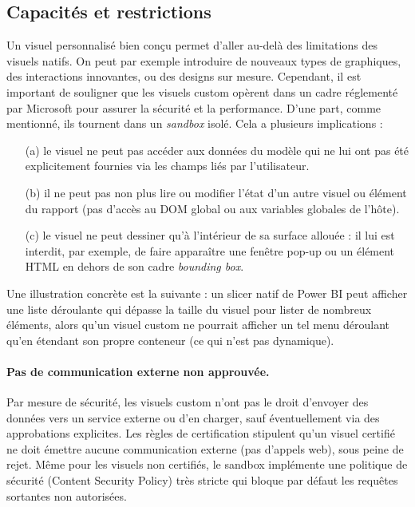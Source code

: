 \subsection*{Capacités et restrictions}
Un visuel personnalisé bien conçu permet d’aller au-delà des limitations des visuels natifs. On peut par exemple introduire de nouveaux types de graphiques, des interactions innovantes, ou des designs sur mesure. Cependant, il est important de souligner que les visuels custom opèrent dans un cadre réglementé par Microsoft pour assurer la sécurité et la performance. D’une part, comme mentionné, ils tournent dans un \textit{sandbox} isolé. Cela a plusieurs implications :
\begin{itemize}
  \item[(a)] le visuel ne peut pas accéder aux données du modèle qui ne lui ont pas été explicitement fournies via les champs liés par l’utilisateur\parencite{OkVizSandbox}.
  \item[(b)] il ne peut pas non plus lire ou modifier l’état d’un autre visuel ou élément du rapport (pas d’accès au DOM global ou aux variables globales de l’hôte).
  \item[(c)] le visuel ne peut dessiner qu’à l’intérieur de sa surface allouée : il lui est interdit, par exemple, de faire apparaître une fenêtre pop-up ou un élément HTML en dehors de son cadre \textit{bounding box}\parencite{OkVizDropdown}.
\end{itemize}

Une illustration concrète est la suivante : un slicer natif de Power BI peut afficher une liste déroulante qui dépasse la taille du visuel pour lister de nombreux éléments, alors qu’un visuel custom ne pourrait afficher un tel menu déroulant qu’en étendant son propre conteneur (ce qui n’est pas dynamique).

\paragraph*{Pas de communication externe non approuvée.}
Par mesure de sécurité, les visuels custom n’ont pas le droit d’envoyer des données vers un service externe ou d’en charger, sauf éventuellement via des approbations explicites. Les règles de certification stipulent qu’un visuel certifié ne doit émettre aucune communication externe (pas d’appels web), sous peine de rejet\parencite{MediumSecurity1}. Même pour les visuels non certifiés, le sandbox implémente une politique de sécurité (Content Security Policy) très stricte qui bloque par défaut les requêtes sortantes non autorisées\parencite{MediumSecurity2, StackOverflowCSP}.


